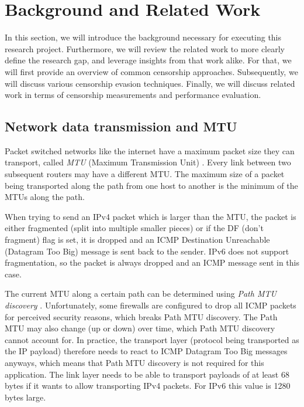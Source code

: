 
\chapter{Background and Related Work}
\label{chap:background}


In this section, we will introduce the background necessary for executing this research project.
Furthermore, we will review the related work to more clearly define the research gap, and leverage insights from that work alike.
For that, we will first provide an overview of common censorship approaches.
Subsequently, we will discuss various censorship evasion techniques.
Finally, we will discuss related work in terms of censorship measurements and performance evaluation.

\section{Network data transmission and MTU}
Packet switched networks like the internet have a maximum packet size they can transport, called \textit{MTU} (Maximum Transmission Unit) \cite{wiki:Maximum_transmission_unit}.
Every link between two subsequent routers may have a different MTU.
The maximum size of a packet being transported along the path from one host to another is the minimum of the MTUs along the path.

When trying to send an IPv4 packet which is larger than the MTU, the packet is either fragmented (split into multiple smaller pieces) or if the DF (don't fragment) flag is set, it is dropped and an ICMP Destination Unreachable (Datagram Too Big) message is sent back to the sender.
IPv6 does not support fragmentation, so the packet is always dropped and an ICMP message sent in this case.

The current MTU along a certain path can be determined using \textit{Path MTU discovery} \cite{wiki:Path_MTU_Discovery}.
Unfortunately, some firewalls are configured to drop all ICMP packets for perceived security reasons, which breaks Path MTU discovery.
The Path MTU may also change (up or down) over time, which Path MTU discovery cannot account for.
In practice, the transport layer (protocol being transported as the IP payload) therefore needs to react to ICMP Datagram Too Big messages anyways, which means that Path MTU discovery is not required for this application.
The link layer needs to be able to transport payloads of at least 68 bytes if it wants to allow transporting IPv4 packets.
For IPv6 this value is 1280 bytes large.

